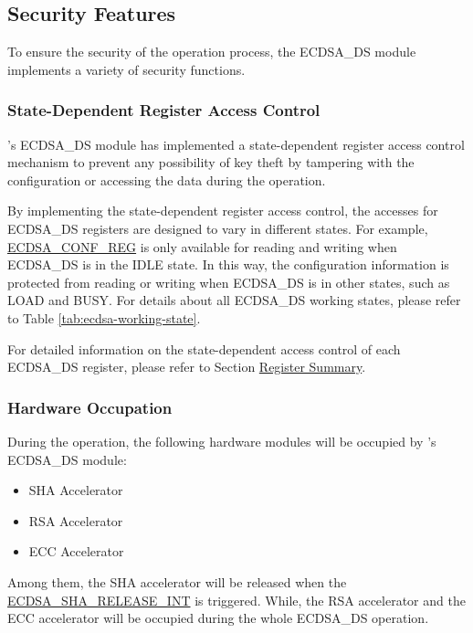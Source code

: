 \documentclass[main\_\_EN.tex]{subfiles}
\begin{document}

\subsection{Security Features}
\label{sec:ecdsa-security_features}
To ensure the security of the operation process, the ECDSA\_DS module implements a variety of security functions.

\subsubsection{State-Dependent Register Access Control}

\chipseries{}'s ECDSA\_DS module has implemented a state-dependent register access control mechanism to prevent any possibility of key theft by tampering with the configuration or accessing the data during the operation.

By implementing the state-dependent register access control, the accesses for ECDSA\_DS registers are designed to vary in different states. For example, \hyperref[regdesc:ECDSACONFREG]{ECDSA\_CONF\_REG} is only available for reading and writing when ECDSA\_DS is in the IDLE state. In this way, the configuration information is protected from reading or writing when ECDSA\_DS is in other states, such as LOAD and BUSY. For details about all ECDSA\_DS working states, please refer to Table \ref{tab:ecdsa-working-state}.

For detailed information on the state-dependent access control of each ECDSA\_DS register, please refer to Section \hyperref[sec:ecdsa-reg-summ]{Register Summary}.

\subsubsection{Hardware Occupation}

During the operation, the following hardware modules will be occupied by \chipname{}'s ECDSA\_DS module:
\begin{itemize}
    \item SHA Accelerator
    \item RSA Accelerator
    \item ECC Accelerator
\end{itemize}
Among them, the SHA accelerator will be released when the \hyperref[int:ECDSASHARELEASEINT]{ECDSA\_SHA\_RELEASE\_INT} is triggered. While, the RSA accelerator and the ECC accelerator will be occupied during the whole ECDSA\_DS operation.
\end{document}
